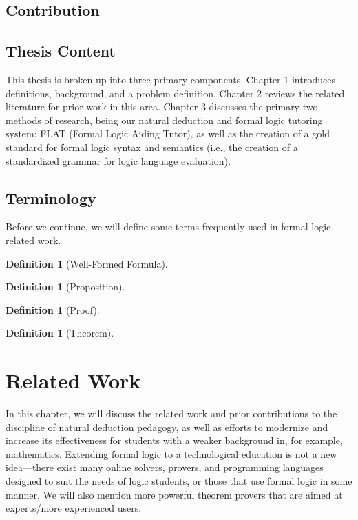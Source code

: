 \documentclass[ms]{uncgdissertationexp2}
\theoremstyle{plain}
\theoremstyle{definition}
\newtheorem{definition}[theorem]{Definition}
\theoremstyle{remark}
\begin{document}
    \section{Contribution}
    \section{Thesis Content}
    This thesis is broken up into three primary components. Chapter 1 introduces definitions, background, and a problem definition. Chapter 2 reviews the related literature for prior work in this area. Chapter 3 discusses the primary two methods of research, being our natural deduction and formal logic tutoring system: FLAT (Formal Logic Aiding Tutor), as well as the creation of a gold standard for formal logic syntax and semantics (i.e., the creation of a standardized grammar for logic language evaluation).
    \section{Terminology}
    Before we continue, we will define some terms frequently used in formal logic-related work.
    \begin{definition}[Well-Formed Formula]
    \end{definition}
    
    \begin{definition}[Proposition]
    \end{definition}

    \begin{definition}[Proof]
    \end{definition}
    
    \begin{definition}[Theorem]
    \end{definition}
\chapter{Related Work}
    In this chapter, we will discuss the related work and prior contributions to the discipline of natural deduction pedagogy, as well as efforts to modernize and increase its effectiveness for students with a weaker background in, for example, mathematics. 
    Extending formal logic to a technological education is not a new idea---there exist many online solvers, provers, and programming languages designed to suit the needs of logic students, or those that use formal logic in some manner. We will also mention more powerful theorem provers that are aimed at experts/more experienced users.
\end{document}
